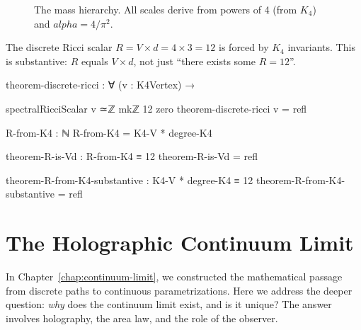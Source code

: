 \documentclass[11pt,a4paper]{book}
\def\alpha{alpha}%
\begin{document}
\begin{figure}[h]
\centering
{}
\caption{The mass hierarchy. All scales derive from powers of 4 (from $K_4$) and $\alpha = 4/\pi^2$.}
\label{fig:mass-hierarchy}
\end{figure}

The discrete Ricci scalar $R = V \times d = 4 \times 3 = 12$ is forced by $K_4$ invariants. This is substantive: $R$ equals $V \times d$, not just ``there exists some $R = 12$''.

\begin{code}
theorem-discrete-ricci : ∀ (v : K4Vertex) → 

  spectralRicciScalar v ≃ℤ mkℤ 12 zero
theorem-discrete-ricci v = refl

R-from-K4 : ℕ
R-from-K4 = K4-V * degree-K4

theorem-R-is-Vd : R-from-K4 ≡ 12
theorem-R-is-Vd = refl

theorem-R-from-K4-substantive : K4-V * degree-K4 ≡ 12
theorem-R-from-K4-substantive = refl

\end{code}

\chapter{The Holographic Continuum Limit}
\label{chap:continuum-holographic}

In Chapter~\ref{chap:continuum-limit}, we constructed the mathematical passage from 
discrete paths to continuous parametrizations. Here we address the deeper question: 
\emph{why} does the continuum limit exist, and is it unique? The answer involves 
holography, the area law, and the role of the observer.
\end{document}
